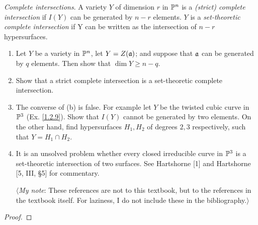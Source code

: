 \label{1.2.17}

\textit{Complete intersections}. A variety $Y$ of dimension $r$ in $\P^n$ is a \textit{(strict) complete intersection} if $I(Y)$ can be generated by $n - r$ elements. $Y$ is a \textit{set-theoretic complete intersection} if Y can be written as the intersection of $n - r$ hypersurfaces.

\begin{enumerate}[label = (\alph*)]
    \item Let $Y$ be a variety in $\P^n$, let $Y = Z(\a)$; and suppose that $\a$ can be generated by $q$ elements. Then show that $\dim Y \geq n - q$.
    
    \item Show that a strict complete intersection is a set-theoretic complete intersection.
    
    \item The converse of (b) is false. For example let $Y$ be the twisted cubic curve in $\P^3$ (Ex. \ref{1.2.9}). Show that $I(Y)$ cannot be generated by two elements. On the other hand, find hypersurfaces $H_1, H_2$ of degrees $2, 3$ respectively, such that $Y = H_1 \cap H_2$.
    
    \item It is an unsolved problem whether every closed irreducible curve in $\P^3$ is a set-theoretic intersection of two surfaces. See Hartshorne [1] and Hartshorne [5, III, §5] for commentary.
    
    $\langle$\textit{My note}: These references are not to this textbook, but to the references in the textbook itself. For laziness, I do not include these in the bibliography.$\rangle$
\end{enumerate}

\begin{proof}
    
\end{proof}